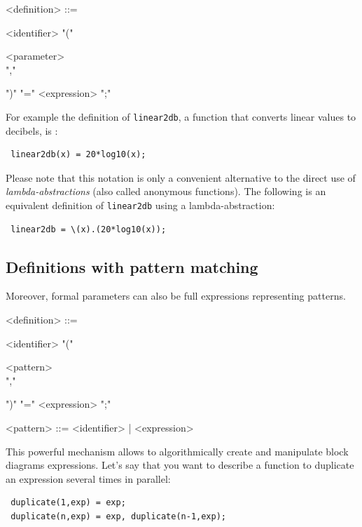 \documentclass[a4paper]{book}
\begin{document}
\begin{grammar}
  <definition> ::= 
  \begin{syntdiag}
    <identifier> "(" 
    \begin{rep}
      <parameter> \\ ","
    \end{rep}
    ")" "=" <expression> ";"
  \end{syntdiag}
\end{grammar}

For example the definition of \lstinline'linear2db', a function that converts linear values to decibels, is :

\begin{lstlisting}
 linear2db(x) = 20*log10(x);
\end{lstlisting}
 
Please note that this notation is only a convenient alternative to the direct use of \textit{lambda-abstractions} (also called anonymous functions). The following is an equivalent definition of \lstinline'linear2db' using a lambda-abstraction:

\begin{lstlisting}
 linear2db = \(x).(20*log10(x));
\end{lstlisting}


\subsection{Definitions with pattern matching}

Moreover, formal parameters can also be full expressions representing patterns. 

\begin{grammar}
  <definition> ::= 
  \begin{syntdiag}
    <identifier> "(" 
    \begin{rep}
      <pattern> \\ ","
    \end{rep}
    ")" "=" <expression> ";"
  \end{syntdiag}
\end{grammar}

\begin{grammar}
  <pattern> ::= 
    <identifier> |  <expression>
\end{grammar}

This powerful mechanism allows to algorithmically create and manipulate block diagrams expressions. Let's say that you want to describe a function to duplicate an expression several times in parallel:
\begin{lstlisting}
 duplicate(1,exp) = exp;
 duplicate(n,exp) = exp, duplicate(n-1,exp);
\end{lstlisting}
\end{document}
